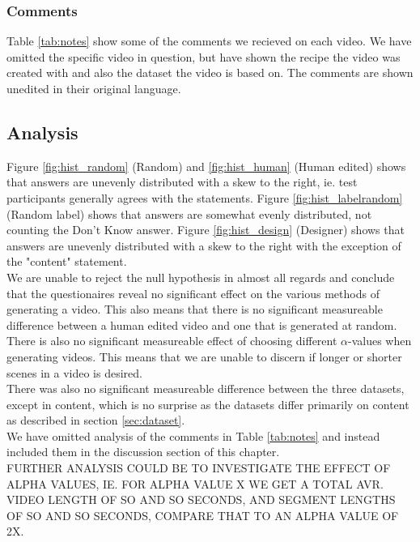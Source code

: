 \subsubsection{Comments}\label{sec:comments}
%
Table \ref{tab:notes} show some of the comments we recieved on each video. We have omitted the specific video in question, but have shown the recipe the video was created with and also the dataset the video is based on. The comments are shown unedited in their original language.
%

%
\subsection{Analysis}
%
Figure \ref{fig:hist_random} (Random) and \ref{fig:hist_human} (Human edited) shows that answers are unevenly distributed with a skew to the right, ie. test participants generally agrees with the statements. Figure \ref{fig:hist_labelrandom} (Random label) shows that answers are somewhat evenly distributed, not counting the Don't Know answer. Figure \ref{fig:hist_design} (Designer) shows that answers are unevenly distributed with a skew to the right with the exception of the "content" statement.\\
We are unable to reject the null hypothesis in almost all regards and conclude that the questionaires reveal no significant effect on the various methods of generating a video. This also means that there is no significant measureable difference between a human edited video and one that is generated at random.\\
%
There is also no significant measureable effect of choosing different $\alpha$-values when generating videos. This means that we are unable to discern if longer or shorter scenes in a video is desired.\\
%
There was also no significant measureable difference between the three datasets, except in content, which is no surprise as the datasets differ primarily on content as described in section \ref{sec:dataset}.\\
%
We have omitted analysis of the comments in Table \ref{tab:notes} and instead included them in the discussion section of this chapter.\\
%
FURTHER ANALYSIS COULD BE TO INVESTIGATE THE EFFECT OF ALPHA VALUES, IE. FOR ALPHA VALUE X WE GET A TOTAL AVR. VIDEO LENGTH OF SO AND SO SECONDS, AND SEGMENT LENGTHS OF SO AND SO SECONDS, COMPARE THAT TO AN ALPHA VALUE OF 2X.\\
%
